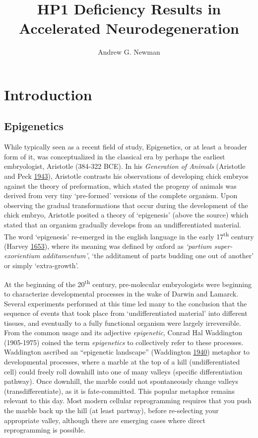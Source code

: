 \documentclass[onehalf,12pt]{beavtex}
\title{HP1 Deficiency Results in Accelerated Neurodegeneration} %
\author{Andrew G. Newman} %
\begin{document}
\maketitle
\mainmatter
\pagestyle{fancyplain} %

  \chapter{Introduction}\label{introduction}
  
  \section{Epigenetics}\label{epigenetics}
  
  While typically seen as a recent field of study, Epigenetics, or at
  least a broader form of it, was conceptualized in the classical era by
  perhaps the earliest embryologist, Aristotle (384-322 BCE). In his
  \emph{Generation of Animals} (Aristotle and Peck
  \protect\hyperlink{ref-AristotleGenerationanimalsEnglish1943}{1943}),
  Aristotle contrasts his observations of developing chick embryos against
  the theory of preformation, which stated the progeny of animals was
  derived from very tiny `pre-formed' versions of the complete organism.
  Upon observing the gradual transformations that occur during the
  development of the chick embryo, Aristotle posited a theory of
  `epigenesis' (above the source) which stated that an organism gradually
  develops from an undifferentiated material. The word `epigenesis'
  re-emerged in the english language in the early 17\textsuperscript{th}
  century (Harvey
  \protect\hyperlink{ref-HarveyAnatomicalexercitationsconcerning1653}{1653}),
  where its meaning was defined by oxford as \emph{`partium
  super-exorientium additamentum'}, `the additament of parts budding one
  out of another' or simply `extra-growth'.
  
  At the beginning of the 20\textsuperscript{th} century, pre-molecular
  embryologists were beginning to characterize developmental processes in
  the wake of Darwin and Lamarck. Several experiments performed at this
  time led many to the conclusion that the sequence of events that took
  place from `undifferentiated material' into different tissues, and
  eventually to a fully functional organism were largely irreversible.
  From the common usage and its adjective \emph{epigenetic}, Conrad Hal
  Waddington (1905-1975) coined the term \emph{epigenetics} to
  collectively refer to these processes. Waddington ascribed an
  ``epigenetic landscape'' (Waddington
  \protect\hyperlink{ref-WaddingtonOrganisersGenes1940}{1940}) metaphor to
  developmental processes, where a marble at the top of a hill
  (undifferentiated cell) could freely roll downhill into one of many
  valleys (specific differentiation pathway). Once downhill, the marble
  could not spontaneously change valleys (transdifferentiate), as it is
  fate-committed. This popular metaphor remains relevant to this day. Most
  modern cellular reprogramming requires that you push the marble back up
  the hill (at least partway), before re-selecting your appropriate
  valley, although there are emerging cases where direct reprogramming is
  possible.
  
\end{document}
